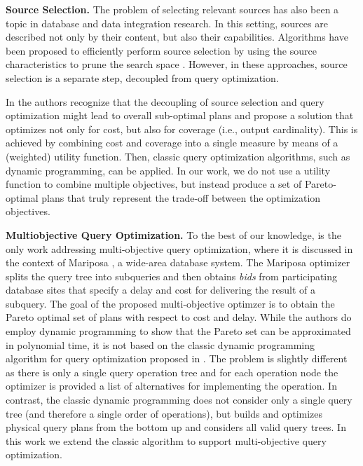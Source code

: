 
\textbf{Source Selection.} The problem of selecting relevant sources
has also been a topic in database and data integration research. In
this setting, sources are described not only by their content, but
also their capabilities. Algorithms have been proposed to efficiently
perform source selection by using the source characteristics to prune
the search space \cite{levy_querying_1996}. However, in these
approaches, source selection is a separate step, decoupled from query
optimization.

In \cite{nie_joint_2001} the authors recognize that the decoupling of
source selection and query optimization might lead to overall
sub-optimal plans and propose a solution that optimizes not only for
cost, but also for coverage (i.e., output cardinality). This is
achieved by combining cost and coverage into a single measure by means
of a (weighted) utility function. Then, classic query optimization
algorithms, such as dynamic programming, can be applied. In our work,
we do not use a utility function to combine multiple objectives, but
instead produce a set of Pareto-optimal plans that truly represent the
trade-off between the optimization objectives.




\textbf{Multiobjective Query Optimization.} To the best of our
knowledge, \cite{papadimitriou_multiobjective_2001} is the only work
addressing multi-objective query optimization, where it is discussed
in the context of Mariposa \cite{stonebraker_mariposa:_1996}, a
wide-area database system. The Mariposa optimizer splits the query
tree into subqueries and then obtains \emph{bids} from participating
database sites that specify a delay and cost for delivering the result
of a subquery. The goal of the proposed multi-objective optimzer
\cite{papadimitriou_multiobjective_2001} is to obtain the Pareto
optimal set of plans with respect to cost and delay. While the authors
do employ dynamic programming to show that the Pareto set can be
approximated in polynomial time, it is not based on the classic
dynamic programming algorithm for query optimization proposed in
\cite{selinger_access_1979}. The problem is slightly different as
there is only a single query operation tree and for each operation
node the optimizer is provided a list of alternatives for implementing
the operation. In contrast, the classic dynamic programming
\cite{selinger_access_1979} does not consider only a single query tree
(and therefore a single order of operations), but builds and optimizes
physical query plans from the bottom up and considers all valid query
trees. In this work we extend the classic algorithm to support
multi-objective query optimization.



